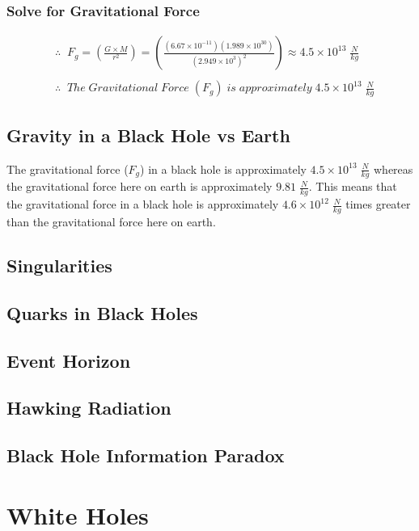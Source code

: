 \documentclass{article}
\begin{document}
\subsubsection{Solve for Gravitational Force}
\begin{align*}
     & \therefore\;\; F_g = \left(\frac{G\times M}{r^2}\right) = \left(\frac{(6.67 \times 10^{-11})(1.989\times 10^{30})}{(2.949 \times 10^{3})^2}\right) \approx 4.5 \times 10^{13} \;\frac{N}{kg} \\\\
     & \therefore\;\; The\; Gravitational\; Force\; (F_g)\; is\; approximately\; 4.5 \times 10^{13} \;\frac{N}{kg}
\end{align*}

\subsection{Gravity in a Black Hole vs Earth}
The gravitational force ($F_g$) in a black hole is approximately $4.5 \times 10^{13}\; \frac{N}{kg}$ whereas the gravitational force here on earth is approximately $9.81\; \frac{N}{kg}$. This means that the gravitational force in a black hole is approximately $4.6 \times 10^{12}\; \frac{N}{kg}$ times greater than the gravitational force here on earth.

\subsection{Singularities}


\subsection{Quarks in Black Holes}


\subsection{Event Horizon}


\subsection{Hawking Radiation}


\subsection{Black Hole Information Paradox}




\section{White Holes}
\end{document}
